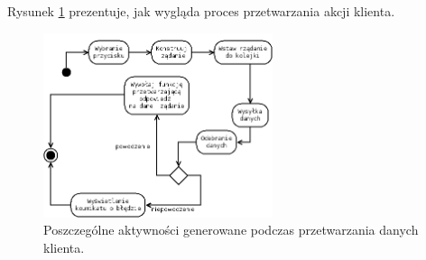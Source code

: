 Rysunek \ref{fig:clientflow} prezentuje, jak wygląda proces przetwarzania akcji klienta.

\begin{figure}[ht]
    \centering
    \includegraphics[width=0.6\textwidth]{imgs/clientflow.png}
    \caption{Poszczególne aktywności generowane podczas przetwarzania danych klienta.}
    \label{fig:clientflow}
\end{figure}
